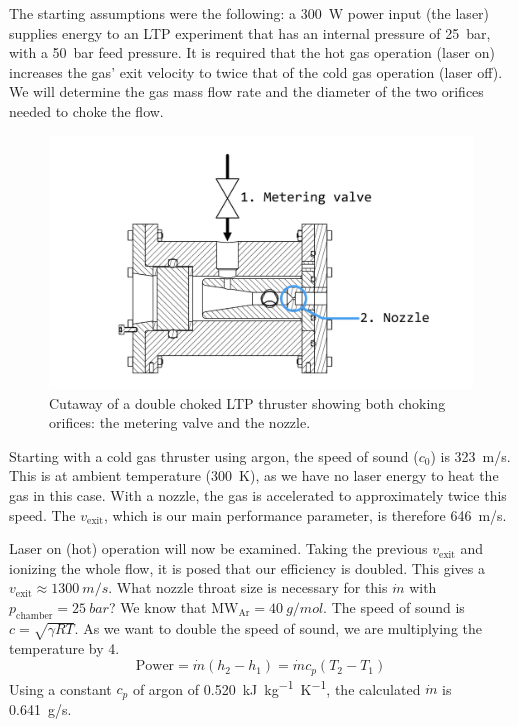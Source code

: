            The starting assumptions were the following: a \qty{300}{W} power input (the laser) supplies energy to an LTP experiment that has an internal pressure of \qty{25}{bar}, with a \qty{50}{bar} feed pressure. It is required that the hot gas operation (laser on) increases the gas' exit velocity to twice that of the cold gas operation (laser off). We will determine the gas mass flow rate and the diameter of the two orifices needed to choke the flow.

            \begin{figure}[h]
                \centering
                \includegraphics[width=0.8\linewidth]{assets/3 design/Double choked LTP thruster.pdf}
                \caption{Cutaway of a double choked LTP thruster showing both choking orifices: the metering valve and the nozzle.}
                \label{fig:double choke sizing}
            \end{figure}
            
            Starting with a cold gas thruster using argon, the speed of sound ($c_0$) is \qty{323}{m/s}. This is at ambient temperature (\qty{300}{K}), as we have no laser energy to heat the gas in this case. With a nozzle, the gas is accelerated to approximately twice this speed. The $v_\mathrm{exit}$, which is our main performance parameter, is therefore \qty{646}{m/s}.
            
            Laser on (hot) operation will now be examined. Taking the previous $v_\mathrm{exit}$ and ionizing the whole flow, it is posed that our efficiency is doubled. This gives a $v_\mathrm{exit}\approx \qty{1300}{m/s}$. What nozzle throat size is necessary for this $\dot m$ with $p_\mathrm{chamber} = \qty{25}{bar}$? We know that $\mathrm{MW_{Ar}} = \qty{40}{g/mol}$. The speed of sound is $c = \sqrt{\gamma R T}$. As we want to double the speed of sound, we are multiplying the temperature by 4.
            \[\text{Power} = \dot m (h_2-h_1)
            = \dot m c_p (T_2-T_1)\]
            Using a constant $c_p$ of argon of \qty{0.520}{kJ.kg^{-1}.K^{-1}}, the calculated $\dot m$ is \qty{0.641}{g/s}.
            
